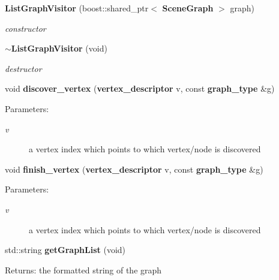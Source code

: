 \begin{CompactItemize}
\item 
{\bf ListGraphVisitor} (boost::shared\_\-ptr$<$ {\bf SceneGraph} $>$ graph)
\begin{CompactList}\small\item\em constructor \item\end{CompactList}\item 
{\bf $\sim$ListGraphVisitor} (void)
\begin{CompactList}\small\item\em destructor \item\end{CompactList}\item 
void {\bf discover\_\-vertex} ({\bf vertex\_\-descriptor} v, const {\bf graph\_\-type} \&g)
\begin{CompactList}\small\item\em \begin{Desc}
\item[Parameters:]
\begin{description}
\item[{\em v}]a vertex index which points to which vertex/node is discovered \end{description}
\end{Desc}
\item\end{CompactList}\item 
void {\bf finish\_\-vertex} ({\bf vertex\_\-descriptor} v, const {\bf graph\_\-type} \&g)
\begin{CompactList}\small\item\em \begin{Desc}
\item[Parameters:]
\begin{description}
\item[{\em v}]a vertex index which points to which vertex/node is discovered \end{description}
\end{Desc}
\item\end{CompactList}\item 
std::string {\bf getGraphList} (void)
\begin{CompactList}\small\item\em \begin{Desc}
\item[Returns:]the formatted string of the graph \end{Desc}
\item\end{CompactList}\end{CompactItemize}
